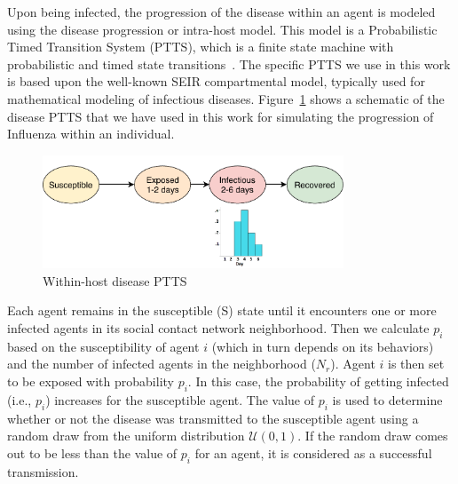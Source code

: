 \documentclass[doublespace]{VTthesis}
\begin{document}
    Upon being infected, the progression of the disease within an agent is modeled using the disease progression or intra-host model. This model is a Probabilistic Timed Transition System (PTTS), which is a finite state machine with probabilistic and timed state transitions~\cite{bisset2009modeling}. The specific PTTS we use in this work is based upon the well-known SEIR compartmental model, typically used for mathematical modeling of infectious diseases. Figure~\ref{fig:disease} shows a schematic of the disease PTTS that we have used in this work for simulating the progression of Influenza within an individual. 
    \begin{figure}
    \centering
    \includegraphics[width=0.8\textwidth]{figures/disease-fsm.pdf}
    \caption{Within-host disease PTTS}
    \label{fig:disease}
    \end{figure}
    
    Each agent remains in the susceptible (S) state until it encounters one or more infected agents in its social contact network neighborhood. Then we calculate $p_i$ based on the susceptibility of agent $i$ (which in turn depends on its behaviors) and the number of infected agents in the neighborhood ($N_r$). Agent $i$ is then set to be exposed with probability $p_i$. In this case, the probability of getting infected (i.e., $p_i$) increases for the susceptible agent. The value of $p_i$ is used to determine whether or not the disease was transmitted to the susceptible agent using a random draw from the uniform distribution $\mathcal{U}(0,1)$. If the random draw comes out to be less than the value of $p_i$ for an agent, it is considered as a successful transmission. 
    
\end{document}
